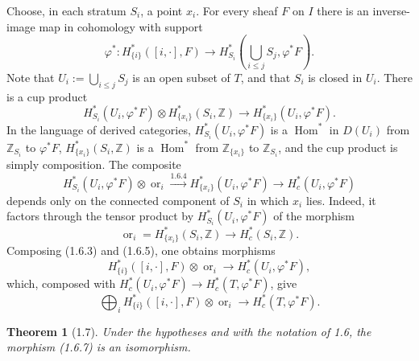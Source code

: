 \documentclass[11pt]{article}
\newtheorem{theorem}{Theorem}[section]
\theoremstyle{definition}
\newcommand{\ZZ}{\mathbb Z}
\newcommand{\Hom}{\operatorname{Hom}}
\newcommand{\ornt}{\operatorname{or}}
\begin{document}
Choose, in each stratum $S_i$, a point $x_i$.  For every sheaf $F$ on $I$ there is an inverse-image map in cohomology with support
\begin{equation}
\varphi^*:H^*_{\{i\}}([i,\cdot],F)\longrightarrow H^*_{S_i}\left(\bigcup_{i\leq j}S_j,\varphi^*F\right).\tag{1.6.3}
\end{equation}
Note that $U_i:=\bigcup_{i\leq j}S_j$ is an open subset of $T$, and that $S_i$ is closed in $U_i$.  There is a cup product
\begin{equation}
H^*_{S_i}(U_i,\varphi^*F)\otimes H^*_{\{x_i\}}(S_i,\ZZ)\longrightarrow H^*_{\{x_i\}}(U_i,\varphi^*F).\tag{1.6.4}
\end{equation}
In the language of derived categories, $H^*_{S_i}(U_i,\varphi^*F)$ is a $\Hom^*$ in $D(U_i)$ from $\ZZ_{S_i}$ to $\varphi^*F$, $H^*_{\{x_i\}}(S_i,\ZZ)$ is a $\Hom^*$ from $\ZZ_{\{x_i\}}$ to $\ZZ_{S_i}$, and the cup product is simply composition.  The composite
\begin{equation}
H^*_{S_i}(U_i,\varphi^*F)\otimes \ornt_i\xrightarrow{1.6.4}H^*_{\{x_i\}}(U_i,\varphi^*F)\longrightarrow H^*_c(U_i,\varphi^*F)\tag{1.6.5}
\end{equation}
depends only on the connected component of $S_i$ in which $x_i$ lies.  Indeed, it factors through the tensor product by $H^*_{S_i}(U_i,\varphi^*F)$ of the morphism
\[
\ornt_i=H^*_{\{x_i\}}(S_i,\ZZ)\longrightarrow H_c^*(S_i,\ZZ).
\]
Composing (1.6.3) and (1.6.5), one obtains morphisms
\begin{equation}
H^*_{\{i\}}([i,\cdot],F)\otimes \ornt_i\longrightarrow H_c^*(U_i,\varphi^*F),\tag{1.6.6}
\end{equation}
which, composed with $H_c^*(U_i,\varphi^*F)\to H_c^*(T,\varphi^*F)$, give
\begin{equation}
\bigoplus_i H^*_{\{i\}}([i,\cdot],F)\otimes \ornt_i\longrightarrow H_c^*(T,\varphi^*F).\tag{1.6.7}
\end{equation}

\begin{theorem}[1.7]
Under the hypotheses and with the notation of 1.6, the morphism (1.6.7) is an isomorphism.
\end{theorem}
\end{document}
